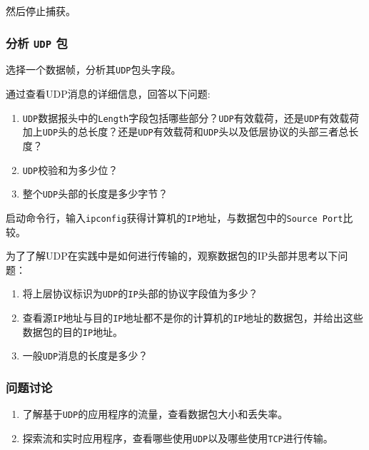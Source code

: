 \documentclass{article}
\begin{document}
然后停止捕获。

\subsubsection{分析 \texttt{UDP} 包}
选择一个数据帧，分析其\texttt{UDP}包头字段。


通过查看UDP消息的详细信息，回答以下问题:
\begin{enumerate}[label={\arabic*})]
  \item \texttt{UDP}数据报头中的\texttt{Length}字段包括哪些部分？\texttt{UDP}有效载荷，还是\texttt{UDP}有效载荷加上\texttt{UDP}头的总长度？还是\texttt{UDP}有效载荷和\texttt{UDP}头以及低层协议的头部三者总长度？
  \item \texttt{UDP}校验和为多少位？
  \item 整个\texttt{UDP}头部的长度是多少字节？
\end{enumerate}

启动命令行，输入\texttt{ipconfig}获得计算机的\texttt{IP}地址，与数据包中的\texttt{Source Port}比较。

为了了解UDP在实践中是如何进行传输的，观察数据包的IP头部并思考以下问题：
\begin{enumerate}[label={\arabic*})]
  \item 将上层协议标识为\texttt{UDP}的\texttt{IP}头部的协议字段值为多少？

  \item 查看源\texttt{IP}地址与目的\texttt{IP}地址都不是你的计算机的\texttt{IP}地址的数据包，并给出这些数据包的目的\texttt{IP}地址。

  \item 一般\texttt{UDP}消息的长度是多少？
\end{enumerate}



\subsubsection{问题讨论}


\begin{enumerate}[noitemsep]
  \item 了解基于\texttt{UDP}的应用程序的流量，查看数据包大小和丢失率。

  \item 探索流和实时应用程序，查看哪些使用\texttt{UDP}以及哪些使用\texttt{TCP}进行传输。

\end{enumerate}
\end{document}
